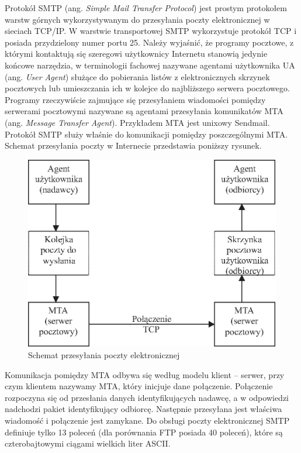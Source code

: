 Protokół SMTP (ang. \emph{Simple Mail Transfer Protocol}) jest prostym protokołem warstw górnych wykorzystywanym do 
przesyłania poczty elektronicznej w sieciach TCP/IP. W warstwie transportowej SMTP wykorzystuje protokół TCP i 
posiada przydzielony numer portu 25. Należy wyjaśnić, że programy pocztowe, z którymi kontaktują się szeregowi 
użytkownicy Internetu stanowią jedynie końcowe narzędzia, w terminologii fachowej nazywane agentami użytkownika 
UA (ang. \emph{User Agent}) służące do pobierania listów z elektronicznych skrzynek pocztowych lub umieszczania ich w 
kolejce do najbliższego serwera pocztowego. Programy rzeczywiście zajmujące się przesyłaniem wiadomości pomiędzy 
serwerami pocztowymi nazywane są agentami przesyłania komunikatów MTA (ang. \emph{Message Transfer Agent}). Przykładem 
MTA jest unixowy Sendmail. Protokół SMTP służy właśnie do komunikacji pomiędzy poszczególnymi MTA. Schemat 
przesyłania poczty w Internecie przedstawia poniższy rysunek.
\begin{figure}[h]
\centering
\includegraphics[width=5in]{./rysunki/obsluga_poczty.eps}
\caption{Schemat przesyłania poczty elektronicznej}
\label{poczta}
\end{figure}

Komunikacja pomiędzy MTA odbywa się według modelu klient -- serwer, przy czym klientem nazywamy MTA, który inicjuje dane 
połączenie. Połączenie rozpoczyna się od przesłania danych identyfikujących nadawcę, a w odpowiedzi nadchodzi pakiet 
identyfikujący odbiorcę. Następnie przesyłana jest właściwa wiadomość i połączenie jest zamykane. Do obsługi poczty 
elektronicznej SMTP definiuje tylko 13 poleceń (dla porównania FTP posiada 40 poleceń), które są czterobajtowymi ciągami 
wielkich liter ASCII.

